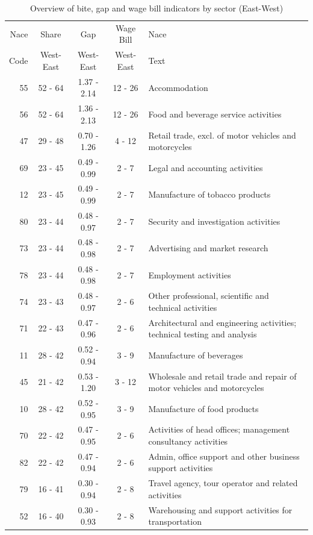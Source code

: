 \begin{table}[htbp]\centering
\tiny
\caption{Overview of bite, gap and wage bill indicators by sector (East-West)}\label{table:sectorBite}
\begin{threeparttable}
    \begin{tabular}{r|c|c|c|l}
    \toprule
Nace & Share    & Gap       & Wage Bill     & Nace  \\
Code & West-East& West-East & West-East     & Text \\
\midrule
55&	52 - 64&	1.37 - 2.14&	12 - 26&	Accommodation\\
56&	52 - 64&	1.36 - 2.13&	12 - 26&	Food and beverage service activities\\
47&	29 - 48&	0.70 - 1.26&	4 - 12&	Retail trade, excl. of motor vehicles and motorcycles\\
69&	23 - 45&	0.49 - 0.99&	2 - 7&	Legal and accounting activities\\
12&	23 - 45&	0.49 - 0.99&	2 - 7&	Manufacture of tobacco products\\
80&	23 - 44&	0.48 - 0.97&	2 - 7&	Security and investigation activities\\
73&	23 - 44&	0.48 - 0.98&	2 - 7&	Advertising and market research\\
78&	23 - 44&	0.48 - 0.98&	2 - 7&	Employment activities\\
74&	23 - 43&	0.48 - 0.97&	2 - 6&	Other professional, scientific and technical activities\\
71&	22 - 43&	0.47 - 0.96&	2 - 6&	Architectural and engineering activities; technical testing and analysis\\
11&	28 - 42&	0.52 - 0.94&	3 - 9&	Manufacture of beverages\\
45&	21 - 42&	0.53 - 1.20&	3 - 12&	Wholesale and retail trade and repair of motor vehicles and motorcycles\\
10&	28 - 42&	0.52 - 0.95&	3 - 9&	Manufacture of food products\\
70&	22 - 42&	0.47 - 0.95&	2 - 6&	Activities of head offices; management consultancy activities\\
82&	22 - 42&	0.47 - 0.94&	2 - 6&	Admin, office support and other business support activities\\
79&	16 - 41&	0.30 - 0.94&	2 - 8&	Travel agency, tour operator and related activities\\
52&	16 - 40&	0.30 - 0.93&	2 - 8&	Warehousing and support activities for transportation\\

\end{tabular}
\end{threeparttable}
\end{table}
